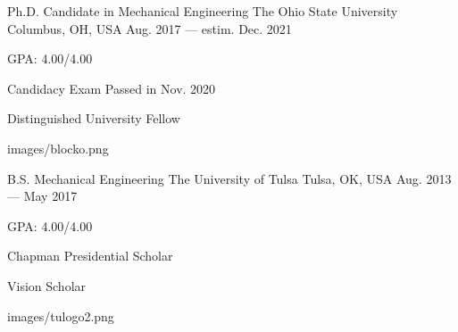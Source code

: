 

\begin{cventries}
	
	\cveducation
	{Ph.D. Candidate in Mechanical Engineering} %
	{The Ohio State University} %
	{Columbus, OH, USA} %
	{Aug. 2017 --- estim. Dec. 2021} %
	{
		\begin{cvitems} %
			\item {GPA: 4.00/4.00}
			\item {Candidacy Exam Passed in Nov. 2020}
			\item {Distinguished University Fellow}
		\end{cvitems}
	}
	{images/blocko.png}

	\cveducation
    {B.S. Mechanical Engineering} %
    {The University of Tulsa} %
    {Tulsa, OK, USA} %
    {Aug. 2013 --- May 2017} %
    {
      \begin{cvitems} %
      	\item {GPA: 4.00/4.00}
        \item {Chapman Presidential Scholar}
        \item {Vision Scholar}
      \end{cvitems}
    }
	{images/tulogo2.png}
\end{cventries}
